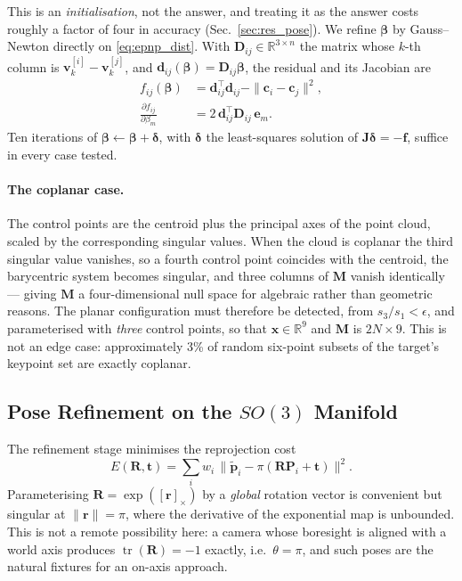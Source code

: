 This is an \emph{initialisation}, not the answer, and treating it as the answer
costs roughly a factor of four in accuracy (Sec.~\ref{sec:res_pose}). We refine
$\boldsymbol{\beta}$ by Gauss--Newton directly on \eqref{eq:epnp_dist}. With
$\mathbf{D}_{ij} \in \mathbb{R}^{3 \times n}$ the matrix whose $k$-th column is
$\mathbf{v}_k^{[i]} - \mathbf{v}_k^{[j]}$, and
$\mathbf{d}_{ij}(\boldsymbol{\beta}) = \mathbf{D}_{ij}\boldsymbol{\beta}$, the
residual and its Jacobian are
\begin{align}
f_{ij}(\boldsymbol{\beta}) &= \mathbf{d}_{ij}^{\top}\mathbf{d}_{ij}
                              - \|\mathbf{c}_i - \mathbf{c}_j\|^2 ,
\label{eq:epnp_resid}\\
\frac{\partial f_{ij}}{\partial \beta_m}
  &= 2\, \mathbf{d}_{ij}^{\top} \mathbf{D}_{ij}\,\mathbf{e}_m .
\label{eq:epnp_jac}
\end{align}
Ten iterations of $\boldsymbol{\beta} \leftarrow \boldsymbol{\beta} +
\boldsymbol{\delta}$, with $\boldsymbol{\delta}$ the least-squares solution of
$\mathbf{J}\boldsymbol{\delta} = -\mathbf{f}$, suffice in every case tested.

\paragraph{The coplanar case.}
The control points are the centroid plus the principal axes of the point
cloud, scaled by the corresponding singular values. When the cloud is
coplanar the third singular value vanishes, so a fourth control point
coincides with the centroid, the barycentric system becomes singular, and
three columns of $\mathbf{M}$ vanish identically --- giving $\mathbf{M}$ a
four-dimensional null space for algebraic rather than geometric reasons. The
planar configuration must therefore be detected, from
$s_3 / s_1 < \epsilon$, and parameterised with \emph{three} control points, so
that $\mathbf{x} \in \mathbb{R}^{9}$ and $\mathbf{M}$ is $2N \times 9$. This
is not an edge case: approximately 3\% of random six-point subsets of the
target's keypoint set are exactly coplanar.

\subsection{Pose Refinement on the $SO(3)$ Manifold}
\label{sec:pnp_manifold}

The refinement stage minimises the reprojection cost
\begin{equation}
E(\mathbf{R}, \mathbf{t}) = \sum_{i} w_i \,
\bigl\| \tilde{\mathbf{p}}_i - \pi(\mathbf{R}\mathbf{P}_i + \mathbf{t}) \bigr\|^2 .
\label{eq:lm_cost}
\end{equation}
Parameterising $\mathbf{R} = \exp([\mathbf{r}]_\times)$ by a \emph{global}
rotation vector is convenient but singular at $\|\mathbf{r}\| = \pi$, where the
derivative of the exponential map is unbounded. This is not a remote
possibility here: a camera whose boresight is aligned with a world axis
produces $\operatorname{tr}(\mathbf{R}) = -1$ exactly, i.e.\
$\theta = \pi$, and such poses are the natural fixtures for an on-axis
approach.

